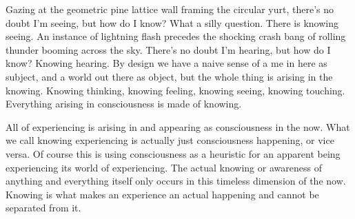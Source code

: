 \documentclass[12pt,openany]{book}
\begin{document}
Gazing at the geometric pine lattice wall framing the circular yurt, there's no doubt I'm seeing, but how do I know? What a silly question. There is knowing seeing. An instance of lightning flash precedes the shocking crash bang of rolling thunder booming across the sky. There's no doubt I'm hearing, but how do I know? Knowing hearing. By design we have a naive sense of a me in here as subject, and a world out there as object, but the whole thing is arising in the knowing. Knowing thinking, knowing feeling, knowing seeing, knowing touching. Everything arising in consciousness is made of knowing.

All of experiencing is arising in and appearing as consciousness in the now. What we call knowing experiencing is actually just consciousness happening, or vice versa. Of course this is using consciousness as a heuristic for an apparent being experiencing its world of experiencing. The actual knowing or awareness of anything and everything itself only occurs in this timeless dimension of the now. Knowing is what makes an experience an actual happening and cannot be separated from it.
\end{document}
